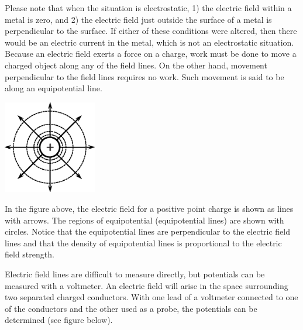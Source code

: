 Please note that when the situation is electrostatic, 1) the electric
field within a metal is zero, and 2) the electric field just outside
the surface of a metal is perpendicular to the surface. If either
of these conditions were altered, then there would be an electric
current in the metal, which is not an electrostatic situation. Because
an electric field exerts a force on a charge, work must be done to move a
charged object along any of the field lines. On the other hand, movement
perpendicular to the field lines requires no work. Such movement is
said to be along an equipotential line.

{\centering \includegraphics[height=1.6in]{electric_fields_and_equipotential_lines/new_ef_fig_2.eps} \par}

In the figure above, the electric field for a positive point charge
is shown as lines with arrows. The regions of equipotential (equipotential
lines) are shown with circles. Notice that the equipotential lines
are perpendicular to the electric field lines and that the density
of equipotential lines is proportional to the electric field strength.

\pagebreak[2]

Electric field lines are difficult to measure directly, but potentials
can be measured with a voltmeter. An electric field will arise in
the space surrounding two separated charged conductors. With one lead
of a voltmeter connected to one of the conductors and the other used
as a probe, the potentials can be determined (see figure below).

\vspace{0.3cm}
{\centering {} \par}
\vspace{0.3cm}

